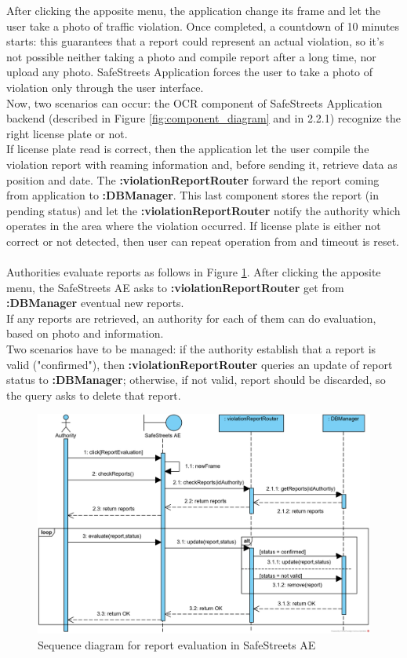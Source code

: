 \documentclass{article}
\begin{document}
			After clicking the apposite menu, the application change its frame and let the user take a photo of traffic violation. Once completed, a countdown of 10 minutes starts: this guarantees that a report could represent an actual violation, so it's not possible neither taking a photo and compile report after a long time, nor upload any photo. SafeStreets Application forces the user to take a photo of violation only through the user interface.\\
			Now, two scenarios can occur: the OCR component of SafeStreets Application backend (described in Figure \ref{fig:component_diagram} and in 2.2.1) recognize the right license plate or not.\\
			If license plate read is correct, then the application let the user compile the violation report with reaming information and, before sending it, retrieve data as position and date. 
			The \textbf{:violationReportRouter} forward the report coming from application to \textbf{:DBManager}.
			This last component stores the report (in pending status) and let the \textbf{:violationReportRouter} notify the authority which operates in the area where the violation occurred. 
			If license plate is either not correct or not detected, then user can repeat operation from and timeout is reset.\\\\
			
			Authorities evaluate reports as follows in Figure \ref{fig:sd-reportEvaluation}.
			After clicking the apposite menu, the SafeStreets AE asks to \textbf{:violationReportRouter} get from \textbf{:DBManager} eventual new reports.\\
			If any reports are retrieved, an authority for each of them can do evaluation, based on photo and information.\\
			Two scenarios have to be managed: if the authority establish that a report is valid ("confirmed"), then \textbf{:violationReportRouter} queries an update of report status to \textbf{:DBManager}; otherwise, if not valid, report should be discarded, so the query asks to delete that report.
			
			\begin{figure}[H]
				\includegraphics [scale=0.8] {diagrams/DD_SeqD_ReportEvaluation.png}
				\caption[Sequence diagram]{Sequence diagram for report evaluation in SafeStreets AE}
				\label{fig:sd-reportEvaluation}
			\end{figure}
			
\end{document}
